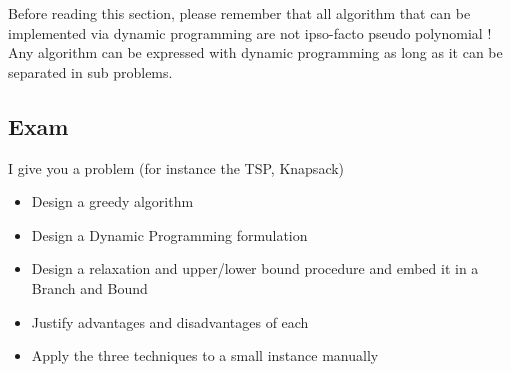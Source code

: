 Before reading this section, please remember that all algorithm that can be
implemented via dynamic programming are not ipso-facto pseudo polynomial ! Any
algorithm can be expressed with dynamic programming as long as it can be separated in
sub problems.

%


\subsection{Exam}
I give you a problem (for instance the TSP, Knapsack)
\begin{itemize}
    \item  Design a greedy algorithm
    \item  Design a Dynamic Programming formulation
    \item  Design a relaxation and upper/lower bound
        procedure and embed it in a Branch and Bound
    \item  Justify advantages and disadvantages of each
    \item  Apply the three techniques to a small instance
        manually
\end{itemize}

